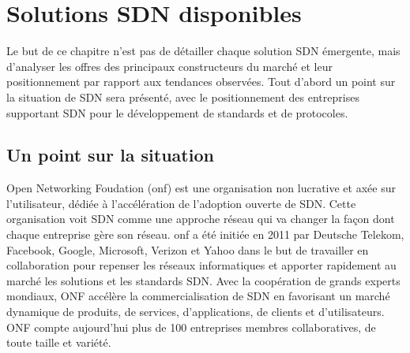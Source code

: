 \chapter{Solutions SDN disponibles}

Le but de ce chapitre n'est pas de détailler chaque solution SDN émergente, mais d'analyser les offres des principaux constructeurs du marché et leur positionnement par rapport aux tendances observées.
Tout d'abord un point sur la situation de SDN sera présenté, avec le positionnement des entreprises supportant SDN pour le développement de standards et de protocoles.




\section{Un point sur la situation}




Open Networking Foudation (\gls{onf}) est une organisation non lucrative et axée sur l'utilisateur, dédiée à l'accélération de l'adoption ouverte de SDN. Cette organisation voit SDN comme une approche réseau qui va changer la façon dont chaque entreprise gère son réseau.
\gls{onf} a été initiée en 2011 par Deutsche Telekom, Facebook, Google, Microsoft, Verizon et Yahoo dans le but de travailler en collaboration pour repenser les réseaux informatiques et apporter rapidement au marché les solutions et les standards SDN. Avec la coopération de grands experts mondiaux, ONF accélère la commercialisation de SDN en favorisant un  marché dynamique de produits, de services, d'applications, de clients et d'utilisateurs. ONF compte aujourd'hui plus de 100 entreprises membres collaboratives, de toute taille et variété. \cite{ONFOverview}

